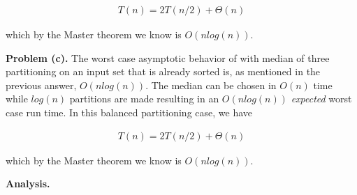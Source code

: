 \documentclass{article}
\begin{document}
\begin{gather}
    T(n) = 2T(n/2) + \Theta(n)
\end{gather}

which by the Master theorem we know is $O(nlog(n))$.

\textbf{Problem (c).} The worst case asymptotic behavior of  with median of three partitioning on an input set that is already sorted is, as mentioned in the previous answer, $O(nlog(n))$. The median can be chosen in $O(n)$ time while $log(n)$ partitions are made resulting in an $O(nlog(n))$ \emph{expected} worst case run time. In this balanced partitioning case, we have

\begin{gather}
    T(n) = 2T(n/2) + \Theta(n)
\end{gather}

which by the Master theorem we know is $O(nlog(n))$.

\hfill

\textbf{Analysis.} 

\newpage
 

\end{document}

